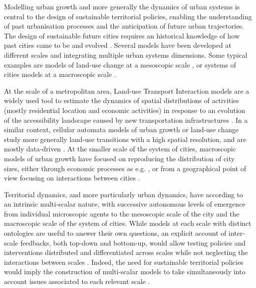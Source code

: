 \documentclass[referee,lineno,pdflatex,sn-apa]{sn-jnl}
\begin{document}
Modelling urban growth and more generally the dynamics of urban systems is central to the design of sustainable territorial policies, enabling the understanding of past urbanisation processes and the anticipation of future urban trajectories. The design of sustainable future cities requires an historical knowledge of how past cities came to be and evolved \citep{batty2018inventing}. Several models have been developed at different scales and integrating multiple urban systems dimensions. Some typical examples are models of land-use change at a mesoscopic scale \citep{iacono2008models}, or systems of cities models at a macroscopic scale \citep{pumain2017urban}.

At the scale of a metropolitan area, Land-use Transport Interaction models \citep{wegener2004land} are a widely used tool to estimate the dynamics of spatial distributions of activities (mostly residential location and economic activities) in response to an evolution of the accessibility landscape caused by new transportation infrastructures \citep{raimbault:halshs-02265423}. In a similar context, cellular automata models of urban growth or land-use change study more generally land-use transitions with a high spatial resolution, and are mostly data-driven \citep{clarke2007decade}. At the smaller scale of the system of cities, macroscopic models of urban growth have focused on reproducing the distribution of city sizes, either through economic processes as e.g. \citep{gabaix1999zipf}, or from a geographical point of view focusing on interactions between cities \citep{favaro2011gibrat}.

Territorial dynamics, and more particularly urban dynamics, have according to \cite{pumain1997pour} an intrinsic multi-scalar nature, with successive autonomous levels of emergence from individual microscopic agents to the mesoscopic scale of the city and the macroscopic scale of the system of cities. While models at each scale with distinct ontologies are useful to answer their own questions, an explicit account of inter-scale feedbacks, both top-down and bottom-up, would allow testing policies and interventions distributed and differentiated across scales while not neglecting the interactions between scales \citep{wegener2018multi}. Indeed, the need for sustainable territorial policies would imply the construction of multi-scalar models to take simultaneously into account issues associated to each relevant scale \citep{Rozenblat2018,raimbault:halshs-02284933}.


\end{document}
